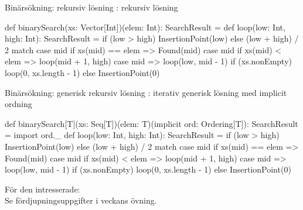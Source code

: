 \begin{Slide}{Binärsökning: rekursiv lösning}
: rekursiv lösning
\begin{Code}
def binarySearch(xs: Vector[Int])(elem: Int): SearchResult = {
  def loop(low: Int, high: Int): SearchResult = 
    if (low > high) InsertionPoint(low) 
    else (low + high) / 2 match {
      case mid if xs(mid) == elem => Found(mid)
      case mid if xs(mid) < elem => loop(mid + 1, high)
      case mid => loop(low, mid - 1)
    }
  if (xs.nonEmpty) loop(0, xs.length - 1) else InsertionPoint(0) 
}
\end{Code}
\end{Slide}


\begin{Slide}{Binärsökning: generisk rekursiv lösning}
: iterativ generisk lösning med implicit ordning
\begin{CodeSmall}
def binarySearch[T](xs: Seq[T])(elem: T)(implicit ord: Ordering[T]): SearchResult = {
  import ord._
  def loop(low: Int, high: Int): SearchResult = 
    if (low > high) InsertionPoint(low) 
    else (low + high) / 2 match {
      case mid if xs(mid) == elem => Found(mid)
      case mid if xs(mid) < elem => loop(mid + 1, high)
      case mid => loop(low, mid - 1)
    }
  if (xs.nonEmpty) loop(0, xs.length - 1) else InsertionPoint(0) 
}
\end{CodeSmall}
För den intresserade:\\Se fördjupningsuppgifter i veckans övning.
\end{Slide}

